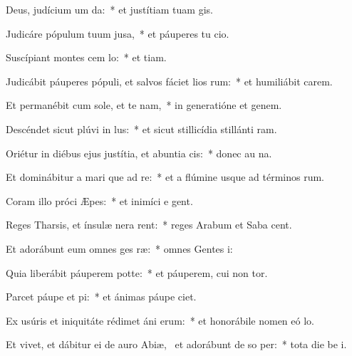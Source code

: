 \item Deus, judícium um  da:~* et justítiam tuam  gis.
\item Judicáre pópulum tuum  jusa,~* et páuperes tu  cio.
\item Suscípiant montes cem lo:~* et  tiam.
\item Judicábit páuperes pópuli, et salvos fáciet lios rum:~* et humiliábit carem.
\item Et permanébit cum sole, et te nam,~* in generatióne et genem.
\item Descéndet sicut plúvi in lus:~* et sicut stillicídia stillánti  ram.
\item Oriétur in diébus ejus justítia, et abuntia cis:~* donec au na.
\item Et dominábitur a mari que ad re:~* et a flúmine usque ad términos  rum.
\item Coram illo próci Æpes:~* et inimíci e  gent.
\item Reges Tharsis, et ínsulæ nera rent:~* reges Arabum et Saba  cent.
\item Et adorábunt eum omnes ges ræ:~* omnes Gentes  i:
\item Quia liberábit páuperem  potte:~* et páuperem, cui non  tor.
\item Parcet páupe et pi:~* et ánimas páupe  ciet.
\item Ex usúris et iniquitáte rédimet áni erum:~* et honorábile nomen eó  lo.
\item Et vivet, et dábitur ei de auro Abiæ,~\pscross{} et adorábunt de so per:~* tota die be i.
